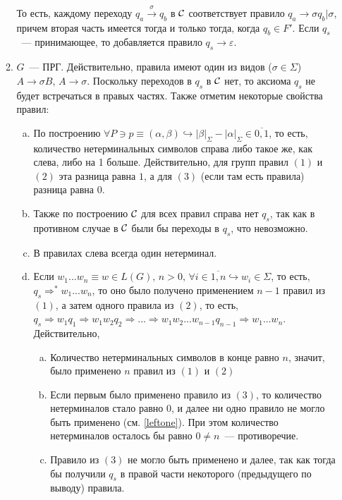 \documentclass[a4paper]{article}
\def\C{{\cal C}}
\begin{document}
\begin{enumerate}
\begin{enumerate}[1.]
То есть, каждому переходу $q_a\overset{\sigma}{\longrightarrow}q_b$ в $\C$ соответствует правило $q_a\longrightarrow\sigma q_b\big|\sigma$, причем вторая часть имеется тогда и только тогда, когда $q_b\in F'$. Если $q_s$~--- принимающее, то добавляется правило $q_s\longrightarrow\varepsilon$.
\item $G$~--- ПРГ. Действительно, правила имеют один из видов ($\sigma\in\Sigma$) $A\longrightarrow\sigma B$, $A\longrightarrow\sigma$. Поскольку переходов в $q_s$ в $\C$ нет, то аксиома $q_s$ не будет встречаться в правых частях.
\newline
Также отметим некоторые свойства правил:\begin{enumerate}[a.]
\item По построению $\forall P\ni p\equiv(\alpha,\beta)\hookrightarrow |\beta|_\Sigma-|\alpha|_\Sigma\in\overline{0,1}$, то есть, количество нетерминальных символов справа либо такое же, как слева, либо на 1 больше. Действительно, для групп правил $(1)$ и $(2)$ эта разница равна $1$, а для $(3)$ (если там есть правила) разница равна $0$.
\item Также по построению $\C$ для всех правил справа нет $q_s$, так как в противном случае в $\C$ были бы переходы в $q_s$, что невозможно.
\item \label{leftone} В правилах слева всегда один нетерминал.
\item \label{w1wninLGthen} Если $w_1...w_n\equiv w\in L(G),\,n>0,\,\forall i\in\overline{1,n}\hookrightarrow w_i\in\Sigma$, то есть, $q_s\Longrightarrow^*w_1...w_n$, то оно было получено применением $n-1$ правил из $(1)$, а затем одного правила из $(2)$, то есть, $q_s\Longrightarrow w_1q_1\Longrightarrow w_1w_2q_2\Longrightarrow...\Longrightarrow w_1w_2...w_{n-1}q_{n-1}\Longrightarrow w_1...w_n$.\newline
Действительно,\begin{enumerate}[a.]
\item \label{sum12} Количество нетерминальных символов в конце равно $n$, значит, было применено $n$ правил из $(1)$ и $(2)$
\item \label{thirdfirst} Если первым было применено правило из $(3)$, то количество нетерминалов стало равно $0$, и далее ни одно правило не могло быть применено (см. \ref{leftone}). При этом количество нетерминалов осталось бы равно $0\neq n$~--- противоречие.
\item \label{thirdnotfirst} Правило из $(3)$ не могло быть применено и далее, так как тогда бы получили $q_s$ в правой части некоторого (предыдущего по выводу) правила.

\end{enumerate}
\end{enumerate}
\end{enumerate}
\end{enumerate}
\end{document}
